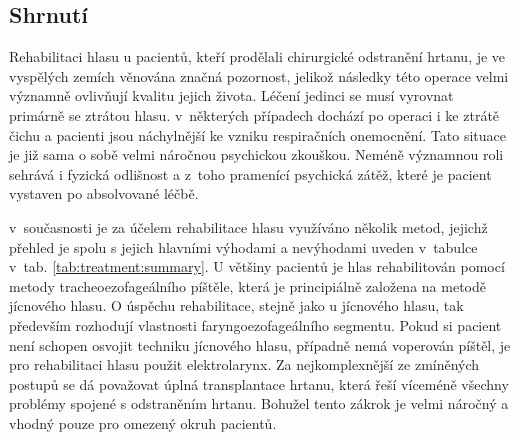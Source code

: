 %


\subsection{Shrnutí} %


Rehabilitaci hlasu u pacientů, kteří prodělali chirurgické odstranění hrtanu, je ve
vyspělých zemích věnována značná pozornost, jelikož následky této operace velmi významně ovlivňují kvalitu jejich života. Léčení jedinci se musí vyrovnat primárně se ztrátou hlasu. v~některých případech dochází po operaci i ke ztrátě čichu a pacienti jsou náchylnější ke vzniku respiračních onemocnění.
Tato situace je již sama o sobě velmi náročnou psychickou zkouškou. Neméně významnou
roli sehrává i fyzická odlišnost a z~toho pramenící psychická zátěž, které je pacient vystaven
po absolvované léčbě.

 v~současnosti je za účelem rehabilitace hlasu využíváno několik metod, jejichž přehled je spolu s jejich hlavními výhodami a nevýhodami uveden v~tabulce v~tab. \ref{tab:treatment:summary}.
U většiny pacientů je hlas rehabilitován pomocí metody tracheoezofageálního píštěle,
která je principiálně založena na metodě jícnového hlasu. O úspěchu rehabilitace, stejně jako u jícnového hlasu, tak
především rozhodují vlastnosti faryngoezofageálního segmentu. Pokud si pacient
není schopen osvojit techniku jícnového hlasu, případně nemá voperován píštěl, je
pro rehabilitaci hlasu použit elektrolarynx. Za nejkomplexnější ze zmíněných postupů se dá považovat úplná transplantace hrtanu, která
řeší víceméně všechny problémy spojené s odstraněním hrtanu. Bohužel tento
zákrok je velmi náročný a vhodný pouze pro omezený okruh pacientů.

